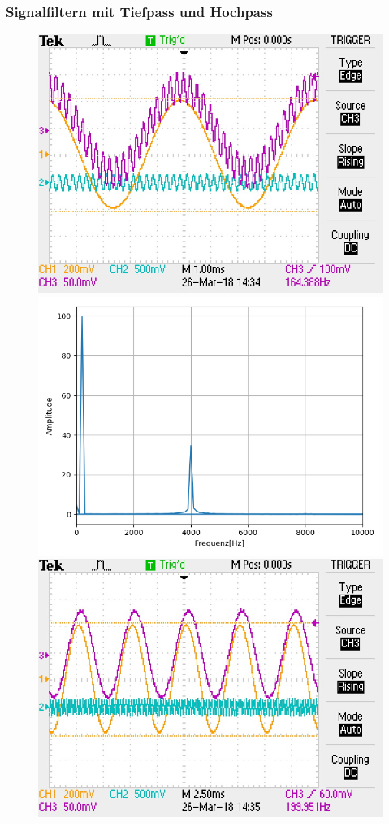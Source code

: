 \documentclass[12pt,a4paper]{article}
\begin{document}
\subsubsection{Signalfiltern mit Tiefpass und Hochpass}
\begin{figure}
\centering
\includegraphics[scale=0.9]{Bilder/Vorversuch3/F0000TEK.JPG}
\includegraphics[scale=0.5]{Bilder/Vorversuch3/Vor3_0.png}
\includegraphics[scale=0.9]{Bilder/Vorversuch3/F0001TEK.JPG}

\end{figure}
\end{document}

